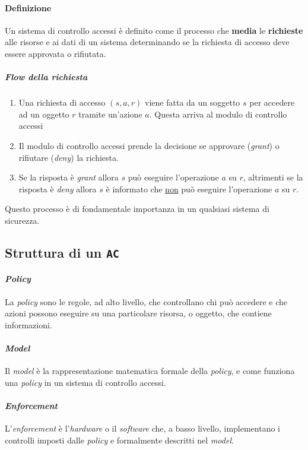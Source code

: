         \paragraph{Definizione} Un sistema di controllo accessi è definito come il processo che \textbf{media} le \textbf{richieste} alle risorse e ai dati di un sistema determinando se la richiesta di accesso deve essere approvata o rifiutata.
            \subparagraph{\textit{Flow} della richiesta} \begin{enumerate}
                \item Una richiesta di accesso $(s,a,r)$ viene fatta da un soggetto $s$ per accedere ad un oggetto $r$ tramite un'azione $a$. Questa arriva al modulo di controllo accessi
                \item Il modulo di controllo accessi prende la decisione se approvare (\textit{grant}) o rifiutare (\textit{deny}) la richiesta.
                \item Se la risposta è \textit{grant} allora $s$ può eseguire l'operazione $a$ su $r$, altrimenti se la risposta è \textit{deny} allora $s$ è informato che \underline{non} può eseguire l'operazione $a$ su $r$.
            \end{enumerate}
        Questo processo è di fondamentale importanza in un qualsiasi sistema di sicurezza.
    \subsection{Struttura di un \texttt{AC}}
        \paragraph{\textit{Policy}} La \textit{policy} sono le regole, ad alto livello, che controllano chi può accedere e che azioni possono eseguire su una particolare risorsa, o oggetto, che contiene informazioni.
        \paragraph{\textit{Model}} Il \textit{model} è la rappresentazione matematica formale della \textit{policy}, e come funziona una \textit{policy} in un sistema di controllo accessi.
        \paragraph{\textit{Enforcement}} L'\textit{enforcement} è l'\textit{hardware} o il \textit{software} che, a basso livello, implementano i controlli imposti dalle \textit{policy} e formalmente descritti nel \textit{model}.
